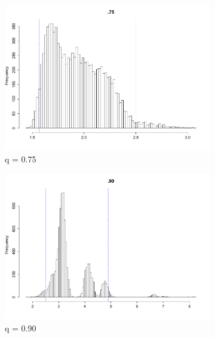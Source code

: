 \documentclass{article}
\renewcommand*{\(}{\left(}
\renewcommand*{\)}{\right)}
\begin{document}
\begin{figure}[H]
    \centering
    \begin{subfigure}[b]{0.3\textwidth}
        \includegraphics[width = \linewidth]{img/BootstrapSmooth-75-100.pdf}
        \caption{q = 0.75}
        \label{fig:smoothB75}
    \end{subfigure}%
    \begin{subfigure}[b]{0.3\textwidth}
        \includegraphics[width = \linewidth]{img/BootstrapSmooth-90-100.pdf}
        \caption{q = 0.90}
        \label{fig:smooth90}
    \end{subfigure}%
    \begin{subfigure}[b]{0.3\textwidth}

\end{subfigure}
\end{figure}
\end{document}
